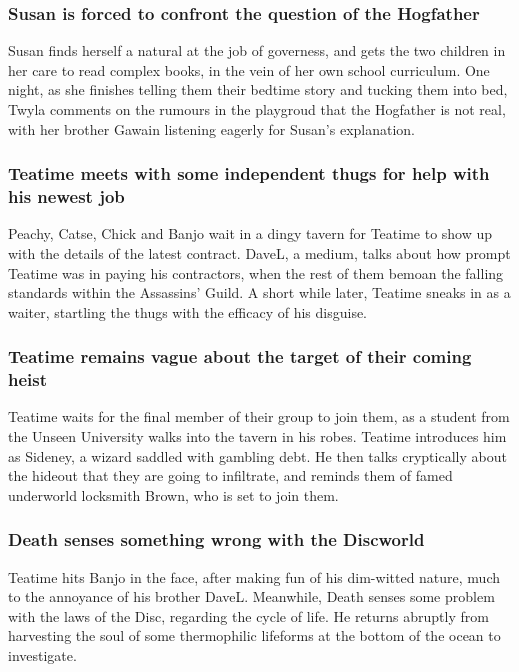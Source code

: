 \subsubsection{\Gls{Susan} is forced to confront the question of the Hogfather}
\Gls{Susan} finds herself a natural at the job of governess, and gets the two children in her care
to read complex books, in the vein of her own school curriculum. One night, as she finishes telling
them their bedtime story and tucking them into bed, \Gls{Twyla} comments on the rumours in the
playgroud that the Hogfather is not real, with her brother \Gls{Gawain} listening eagerly for
\Gls{Susan}'s explanation.

\subsubsection{\Gls{Teatime} meets with some independent thugs for help with his newest job}
\Gls{Peachy}, \Gls{Catse}, \Gls{Chick} and \Gls{Banjo} wait in a dingy tavern for \Gls{Teatime} to
show up with the details of the latest contract. \Gls{DaveL}, a medium, talks about how prompt
\Gls{Teatime} was in paying his contractors, when the rest of them bemoan the falling standards
within the Assassins' Guild. A short while later, \Gls{Teatime} sneaks in as a waiter, startling
the thugs with the efficacy of his disguise.

\subsubsection{\Gls{Teatime} remains vague about the target of their coming heist}
\Gls{Teatime} waits for the final member of their group to join them, as a student from the Unseen
University walks into the tavern in his robes. \Gls{Teatime} introduces him as \Gls{Sideney}, a
wizard saddled with gambling debt. He then talks cryptically about the hideout that they are going
to infiltrate, and reminds them of famed underworld locksmith \Gls{Brown}, who is set to join them.

\subsubsection{\Gls{Death} senses something wrong with the Discworld}
\Gls{Teatime} hits \Gls{Banjo} in the face, after making fun of his dim-witted nature, much to the
annoyance of his brother \Gls{DaveL}. Meanwhile, \Gls{Death} senses some problem with the laws of
the Disc, regarding the cycle of life. He returns abruptly from harvesting the soul of some
thermophilic lifeforms at the bottom of the ocean to investigate.

